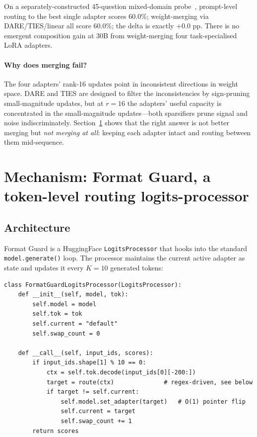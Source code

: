 \documentclass{article}
\begin{document}
On a separately-constructed 45-question mixed-domain probe~\citep{author2026sprintresults}, prompt-level routing to the best single adapter scores 60.0\%; weight-merging via DARE/TIES/linear all score 60.0\%; the delta is exactly $+0.0$ pp. There is no emergent composition gain at 30B from weight-merging four task-specialised LoRA adapters.

\paragraph{Why does merging fail?} The four adapters' rank-16 updates point in inconsistent directions in weight space. DARE and TIES are designed to filter the inconsistencies by sign-pruning small-magnitude updates, but at $r=16$ the adapters' useful capacity is concentrated in the small-magnitude updates---both sparsifiers prune signal and noise indiscriminately. Section~\ref{sec:fg} shows that the right answer is not better merging but \emph{not merging at all}: keeping each adapter intact and routing between them mid-sequence.


\section{Mechanism: Format Guard, a token-level routing logits-processor}
\label{sec:fg}

\subsection{Architecture}

Format Guard is a HuggingFace \texttt{LogitsProcessor} that hooks into the standard \texttt{model.generate()} loop. The processor maintains the current active adapter as state and updates it every $K=10$ generated tokens:

\begin{verbatim}
class FormatGuardLogitsProcessor(LogitsProcessor):
    def __init__(self, model, tok):
        self.model = model
        self.tok = tok
        self.current = "default"
        self.swap_count = 0

    def __call__(self, input_ids, scores):
        if input_ids.shape[1] % 10 == 0:
            ctx = self.tok.decode(input_ids[0][-200:])
            target = route(ctx)              # regex-driven, see below
            if target != self.current:
                self.model.set_adapter(target)   # O(1) pointer flip
                self.current = target
                self.swap_count += 1
        return scores
\end{verbatim}
\end{document}
